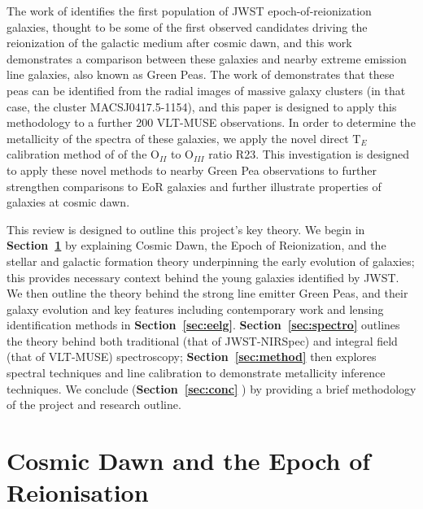 \documentclass[fleqn,usenatbib]{mnras}
\begin{document}
The work of \cite{Rhoads} identifies the first population of JWST epoch-of-reionization galaxies, thought to be some of the first observed candidates driving the reionization of the galactic medium after cosmic dawn, and this work demonstrates a comparison between these galaxies and nearby extreme emission line galaxies, also known as Green Peas. The work of \cite{jauzac} demonstrates that these peas can be identified from the radial images of massive galaxy clusters (in that case, the cluster MACSJ0417.5-1154), and this paper is designed to apply this methodology to a further 200 VLT-MUSE observations. In order to determine the metallicity of the spectra of these galaxies, we apply the novel direct $\mathrm{T}_E$ calibration method of \cite{jiang} of the O$_{II}$ to O$_{III}$ ratio R23. This investigation is designed to apply these novel methods to nearby Green Pea observations to further strengthen comparisons to EoR galaxies and further illustrate properties of galaxies at cosmic dawn. 

This review is designed to outline this project’s key theory. We begin in \textbf{Section~\ref{sec:cdawn}} by explaining Cosmic Dawn, the Epoch of Reionization, and the stellar and galactic formation theory underpinning the early evolution of galaxies; this provides necessary context behind the young galaxies identified by JWST. We then outline the theory behind the strong line emitter Green Peas, and their galaxy evolution and key features including contemporary work and lensing identification methods in \textbf{Section~\ref{sec:eelg}}. \textbf{Section~\ref{sec:spectro}} outlines the theory behind both traditional (that of JWST-NIRSpec) and integral field (that of VLT-MUSE) spectroscopy; \textbf{Section~\ref{sec:method}} then explores spectral techniques and line calibration to demonstrate metallicity inference techniques. We conclude (\textbf{Section~\ref{sec:conc}} ) by providing a brief methodology of the project and research outline.

\section{Cosmic Dawn and the Epoch of Reionisation}
\label{sec:cdawn}
\end{document}
